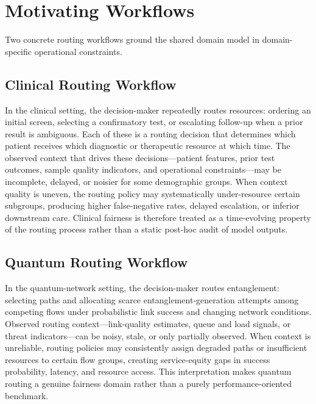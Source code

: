 \documentclass{IEEEtran}
\begin{document}
\section{Motivating Workflows}

Two concrete routing workflows ground the shared domain model in
domain-specific operational constraints.

\subsection{Clinical Routing Workflow}
In the clinical setting, the decision-maker repeatedly routes resources:
ordering an initial screen, selecting a confirmatory test, or escalating
follow-up when a prior result is ambiguous. Each of these is a routing
decision that determines which patient receives which diagnostic or
therapeutic resource at which time. The observed context that drives these
decisions---patient features, prior test outcomes, sample quality indicators,
and operational constraints---may be incomplete, delayed, or noisier for
some demographic groups. When context quality is uneven, the routing policy
may systematically under-resource certain subgroups, producing higher
false-negative rates, delayed escalation, or inferior downstream care.
Clinical fairness is therefore treated as a time-evolving property of the
routing process rather than a static post-hoc audit of model outputs.

\subsection{Quantum Routing Workflow}
In the quantum-network setting, the decision-maker routes entanglement:
selecting paths and allocating scarce entanglement-generation attempts among
competing flows under probabilistic link success and changing network
conditions. Observed routing context---link-quality estimates, queue and load
signals, or threat indicators---can be noisy, stale, or only partially
observed. When context is unreliable, routing policies may consistently
assign degraded paths or insufficient resources to certain flow groups,
creating service-equity gaps in success probability, latency, and resource
access. This interpretation makes quantum routing a genuine fairness domain
rather than a purely performance-oriented benchmark.

\end{document}
